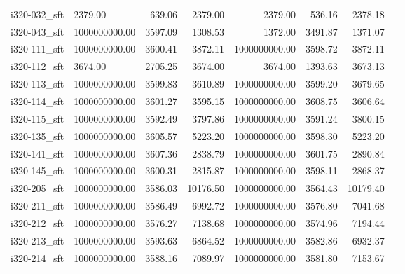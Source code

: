 \begin{tabular}{llrrrrrr}
i320-032\_sft &            2379.00 &                 639.06 &          2379.00 &          2379.00 &               536.16 &        2378.18 \\
i320-043\_sft &      1000000000.00 &                3597.09 &          1308.53 &          1372.00 &              3491.87 &        1371.07 \\
i320-111\_sft &      1000000000.00 &                3600.41 &          3872.11 &    1000000000.00 &              3598.72 &        3872.11 \\
i320-112\_sft &            3674.00 &                2705.25 &          3674.00 &          3674.00 &              1393.63 &        3673.13 \\
i320-113\_sft &      1000000000.00 &                3599.83 &          3610.89 &    1000000000.00 &              3599.20 &        3679.65 \\
i320-114\_sft &      1000000000.00 &                3601.27 &          3595.15 &    1000000000.00 &              3608.75 &        3606.64 \\
i320-115\_sft &      1000000000.00 &                3592.49 &          3797.86 &    1000000000.00 &              3591.24 &        3800.15 \\
i320-135\_sft &      1000000000.00 &                3605.57 &          5223.20 &    1000000000.00 &              3598.30 &        5223.20 \\
i320-141\_sft &      1000000000.00 &                3607.36 &          2838.79 &    1000000000.00 &              3601.75 &        2890.84 \\
i320-145\_sft &      1000000000.00 &                3600.31 &          2815.87 &    1000000000.00 &              3598.11 &        2868.37 \\
i320-205\_sft &      1000000000.00 &                3586.03 &         10176.50 &    1000000000.00 &              3564.43 &       10179.40 \\
i320-211\_sft &      1000000000.00 &                3586.49 &          6992.72 &    1000000000.00 &              3576.80 &        7041.68 \\
i320-212\_sft &      1000000000.00 &                3576.27 &          7138.68 &    1000000000.00 &              3574.96 &        7194.44 \\
i320-213\_sft &      1000000000.00 &                3593.63 &          6864.52 &    1000000000.00 &              3582.86 &        6932.37 \\
i320-214\_sft &      1000000000.00 &                3588.16 &          7089.97 &    1000000000.00 &              3581.80 &        7153.67 \\

\end{tabular}

